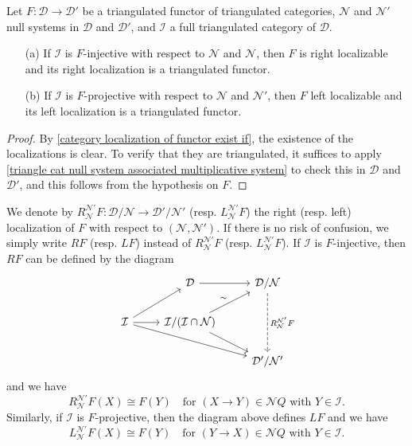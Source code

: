 \begin{proposition}\label{triangle cat localization of functor exist if}
Let $F:\mathcal{D}\to\mathcal{D}'$ be a triangulated functor of triangulated categories, $\mathcal{N}$ and $\mathcal{N}'$ null systems in $\mathcal{D}$ and $\mathcal{D}'$, and $\mathcal{I}$ a full triangulated category of $\mathcal{D}$.
\begin{enumerate}
    \item[(a)] If $\mathcal{I}$ is $F$-injective with respect to $\mathcal{N}$ and $\mathcal{N}$, then $F$ is right localizable and its right localization is a triangulated functor.
    \item[(b)] If $\mathcal{I}$ is $F$-projective with respect to $\mathcal{N}$ and $\mathcal{N}'$, then $F$ left localizable and
    its left localization is a triangulated functor.
\end{enumerate}
\end{proposition}
\begin{proof}
By \cref{category localization of functor exist if}, the existence of the localizations is clear. To verify that they are triangulated, it suffices to apply \cref{triangle cat null system associated multiplicative system} to check this in $\mathcal{D}$ and $\mathcal{D}'$, and this follows from the hypothesis on $F$.
\end{proof}

We denote by $R_\mathcal{N}^{\mathcal{N}'}F:\mathcal{D}/\mathcal{N}\to \mathcal{D}'/\mathcal{N}'$ (resp. $L_\mathcal{N}^{\mathcal{N}'}F$) the right (resp. left) localization of $F$ with respect to $(\mathcal{N},\mathcal{N}')$. If there is no risk of confusion, we simply write $RF$ (resp. $LF$) instead of $R_\mathcal{N}^{\mathcal{N}'}F$ (resp. $L_\mathcal{N}^{\mathcal{N}'}F$). If $\mathcal{I}$ is $F$-injective, then $RF$ can be defined by the diagram
\[\begin{tikzcd}
&\mathcal{D}\ar[r]&\mathcal{D}/\mathcal{N}\ar[dd,dashed,"R_\mathcal{N}^{\mathcal{N}'}F"]\\
\mathcal{I}\ar[r]\ar[ru]\ar[rrd]&\mathcal{I}/(\mathcal{I}\cap\mathcal{N})\ar[ru,"\sim"]\ar[rd]&\\
&&\mathcal{D}'/\mathcal{N}'
\end{tikzcd}\]
and we have
\begin{equation}\label{triangle cat localization functor expression-1}
R_\mathcal{N}^{\mathcal{N}'}F(X)\cong F(Y)\quad\text{for $(X\to Y)\in\mathcal{N}Q$ with $Y\in\mathcal{I}$}.
\end{equation}
Similarly, if $\mathcal{I}$ is $F$-projective, then the diagram above defines $LF$ and we have
\begin{equation}\label{triangle cat localization functor expression-2}
L_\mathcal{N}^{\mathcal{N}'}F(X)\cong F(Y)\quad\text{for $(Y\to X)\in\mathcal{N}Q$ with $Y\in\mathcal{I}$}.
\end{equation}

